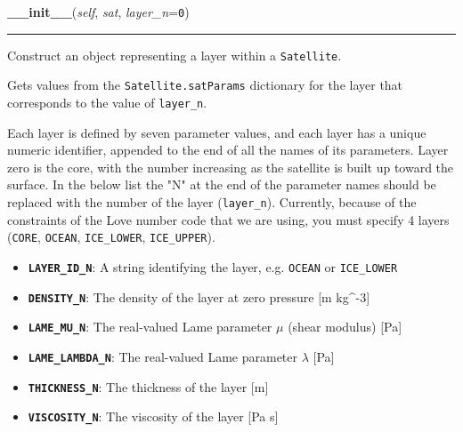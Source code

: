 \hspace{.8\funcindent}\begin{boxedminipage}{\funcwidth}

    \raggedright \textbf{\_\_init\_\_}(\textit{self}, \textit{sat}, \textit{layer\_n}={\tt 0})

    \vspace{-1.5ex}

    \rule{\textwidth}{0.5\fboxrule}
\setlength{\parskip}{2ex}
    Construct an object representing a layer within a \texttt{Satellite}.

    Gets values from the \texttt{Satellite.satParams} dictionary for the 
    layer that corresponds to the value of \texttt{layer\_n}.

    Each layer is defined by seven parameter values, and each layer has a 
    unique numeric identifier, appended to the end of all the names of its 
    parameters.  Layer zero is the core, with the number increasing as the 
    satellite is built up toward the surface.  In the below list the "N" at
    the end of the parameter names should be replaced with the number of 
    the layer (\texttt{layer\_n}).  Currently, because of the constraints 
    of the Love number code that we are using, you must specify 4 layers 
    (\texttt{CORE}, \texttt{OCEAN}, \texttt{ICE\_LOWER}, 
    \texttt{ICE\_UPPER}).

    \begin{itemize}
    \setlength{\parskip}{0.6ex}
      \item \textbf{\texttt{LAYER\_ID\_N}}: A string identifying the layer, 
        e.g. \texttt{OCEAN} or \texttt{ICE\_LOWER}

      \item \textbf{\texttt{DENSITY\_N}}: The density of the layer at zero 
        pressure [m kg{\textasciicircum}-3]

      \item \textbf{\texttt{LAME\_MU\_N}}: The real-valued Lame parameter 
        \(\mu\) (shear modulus) [Pa]

      \item \textbf{\texttt{LAME\_LAMBDA\_N}}: The real-valued Lame parameter 
        \(\lambda\) [Pa]

      \item \textbf{\texttt{THICKNESS\_N}}: The thickness of the layer [m]

      \item \textbf{\texttt{VISCOSITY\_N}}: The viscosity of the layer [Pa s]


\end{itemize}
\end{boxedminipage}
